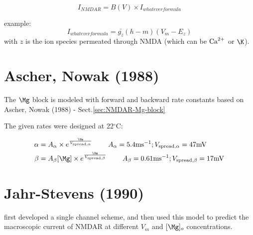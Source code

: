 \begin{equation}
I_{NMDAR} = B(V) \times I_{whatever formula}
\end{equation}

example:
\begin{equation}
I_{whatever formula} = \bar{g_z} (h - m) (V_m - E_z)
\end{equation}
with $z$ is the ion species permeated through NMDA (which can be ${\text{Ca}^{2+}}$ or $\K$).


\section{Ascher, Nowak (1988)}
\label{sec:NMDAR-Mg-block-Ascher-Nowak-1988}

The $\Mg$ block is modeled with forward and backward rate constants based on
Ascher, Nowak (1988) - Sect.\ref{sec:NMDAR-Mg-block}

The given rates were designed at 22$^\circ$C:

\def\ms{{{\text{ms}}}}
\def\mV{{{\text{mV}}}}
\begin{equation}
\begin{split}
\alpha &= A_\alpha \times e^{\frac{\Vm}{V_\text{spread,$\alpha$}}} \qquad \;
A_\alpha = 5.4 \ms^{-1}; V_\text{spread,$\alpha$} = 47 \mV  \\
\beta &= A_\beta [\Mg] \times e^{\frac{\Vm}{V_\text{spread,$\beta$}}} \qquad \;
A_\beta = 0.61 \ms^{-1}; V_\text{spread,$\beta$} = 17 \mV 
\end{split} 
\end{equation}

\section{Jahr-Stevens (1990)}
\label{sec:NMDAR_Jahr-Stevens-1990}

\citep{jahr1990b} first developed a single channel scheme, and then
\citep{jahr1990} used this model to predict the macroscopic current of NMDAR at
different $V_m$ and $[\Mg]_o$ concentrations.

